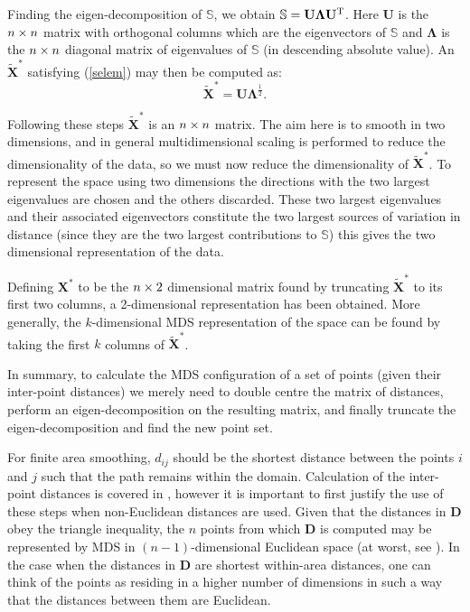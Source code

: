 Finding the eigen-decomposition of $\mathbb{S}$, we obtain $\mathbb{S}=\mathbf{U}\mathbf{\Lambda}\mathbf{U}^{\text{T}}$. Here $\mathbf{U}$ is the $n \times n$ matrix with orthogonal columns which are the eigenvectors of $\mathbb{S}$ and $\mathbf{\Lambda}$ is the $n \times n$ diagonal matrix of eigenvalues of $\mathbb{S}$ (in descending absolute value). An $\tilde{\mathbf{X}}^*$ satisfying (\ref{selem}) may then be computed as:
\begin{equation}
\tilde{\mathbf{X}}^*=\mathbf{U}\mathbf{\Lambda}^{\frac{1}{2}}.
\end{equation}

Following these steps $\tilde{\mathbf{X}}^*$ is an $n \times n$ matrix. The aim here is to smooth in two dimensions, and in general multidimensional scaling is performed to reduce the dimensionality of the data, so we must now reduce the dimensionality of $\tilde{\mathbf{X}}^*$. To represent the space using two dimensions the directions with the two largest eigenvalues are chosen and the others discarded. These two largest eigenvalues and their associated eigenvectors constitute the two largest sources of variation in distance (since they are the two largest contributions to $\mathbb{S}$) this gives the two dimensional representation of the data. 

Defining $\mathbf{X}^*$ to be the $n \times 2$ dimensional matrix found by truncating $\tilde{\mathbf{X}}^*$ to its first two columns, a 2-dimensional representation has been obtained. More generally, the $k$-dimensional MDS representation of the space can be found by taking the first $k$ columns of $\tilde{\mathbf{X}}^*$.

In summary, to calculate the MDS configuration of a set of points (given their inter-point distances) we merely need to double centre the matrix of distances, perform an eigen-decomposition on the resulting matrix, and finally truncate the eigen-decomposition and find the new point set.

For finite area smoothing, $d_{ij}$ should be the shortest distance between the points $i$ and $j$ such that the path remains within the domain. Calculation of the inter-point distances is covered in , however it is important to first justify the use of these steps when non-Euclidean distances are used. Given that the distances in $\mathbf{D}$ obey the triangle inequality, the $n$ points from which $\mathbf{D}$ is computed may be represented by MDS in \label{cor-e8}$(n-1)$-dimensional Euclidean space (at worst, see \label{cor-e9}). \label{cor-r31-3}In the case when the distances in $\mathbf{D}$ are shortest within-area distances, one can think of the points as residing in a higher number of dimensions in such a way that the distances between them are Euclidean.


